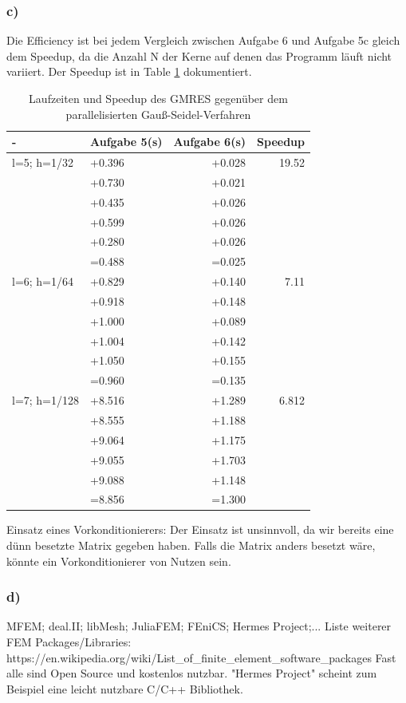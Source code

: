 \documentclass{report}
\begin{document}
	\subsubsection{c)}
Die Efficiency ist bei jedem Vergleich zwischen Aufgabe 6 und Aufgabe 5c gleich dem Speedup, da die Anzahl N der Kerne auf denen das Programm läuft nicht variiert. Der Speedup ist in Table \ref{Table:6c} dokumentiert.\\
\begin{table}
	\centering
\begin{tabular}{|l|l|r|r|}
		\hline
		- & Aufgabe 5(s) & Aufgabe 6(s) & Speedup\\
		\hline
		l=5; h=1/32 &  +0.396 & +0.028 &  19.52 \\
		& +0.730 & +0.021 &    \\
		& +0.435 & +0.026 &    \\
		& +0.599 & +0.026 &    \\
		& +0.280 & +0.026 &   \\
		&=0.488 & =0.025  & \\
		\hline
		l=6; h=1/64 &  +0.829 & +0.140 &  7.11 \\
		& +0.918 & +0.148 &    \\
		& +1.000 & +0.089 &    \\
		& +1.004 & +0.142 &    \\
		& +1.050 & +0.155 &   \\
		&=0.960 & =0.135  & \\
		\hline
		l=7; h=1/128 &  +8.516 & +1.289 & 6.812 \\
		& +8.555 & +1.188 &    \\
		& +9.064 & +1.175 &    \\
		& +9.055 & +1.703 &    \\
		& +9.088 & +1.148 &   \\
		&=8.856 & =1.300 & \\
		\hline
	\end{tabular}
	\caption{Laufzeiten und Speedup des GMRES gegenüber dem parallelisierten Gauß-Seidel-Verfahren}
	\label{Table:6c}
\end{table}
Einsatz eines Vorkonditionierers: Der Einsatz ist unsinnvoll, da wir bereits eine d\"{u}nn besetzte Matrix gegeben haben. Falls die Matrix anders besetzt wäre, könnte ein Vorkonditionierer von Nutzen sein.
	\subsubsection{d)}
MFEM; deal.II; libMesh; JuliaFEM; FEniCS; Hermes Project;...\newline
Liste weiterer FEM Packages/Libraries: https://en.wikipedia.org/wiki/List\_of\_finite\_element\_software\_packages \newline
Fast alle sind Open Source und kostenlos nutzbar. "Hermes Project" scheint zum Beispiel eine leicht nutzbare C/C++ Bibliothek.
\end{document}
